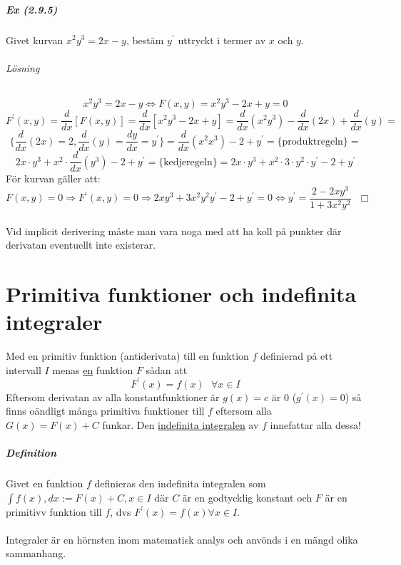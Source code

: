 \paragraph{Ex (2.9.5)} Givet kurvan $x^2y^3=2x-y$, bestäm $y^\prime$ uttryckt i termer av $x$ och $y$.
\subparagraph{Lösning}
\begin{equation*}
    x^2y^3=2x-y\Leftrightarrow F(x,y)=x^2y^3-2x+y=0
\end{equation*}
\begin{equation*}
    F^\prime(x,y)=\frac{d}{dx}[F(x,y)]=\frac{d}{dx}[x^2y^3-2x+y]=\frac{d}{dx}(x^2y^3)-\frac{d}{dx}(2x)+\frac{d}{dx}(y)=
\end{equation*}
\begin{equation*}
    \{\frac{d}{dx}(2x)=2,\frac{d}{dx}(y)=\frac{dy}{dx}=y^\prime\}=\frac{d}{dx}(x^2x^3)-2+y^\prime=\{\text{produktregeln}\}=
\end{equation*}
\begin{equation*}
    2x\cdot y^3+x^2\cdot\frac{d}{dx}(y^3)-2+y^\prime=\{\text{kedjeregeln}\}=2x\cdot y^3+x^2\cdot 3\cdot y^2\cdot y^\prime-2+y^\prime
\end{equation*}
För kurvan gäller att:
\begin{equation*}
    F(x,y)=0\Rightarrow F^\prime(x,y)=0\Rightarrow 2xy^3+3x^2y^2y^\prime-2+y^\prime=0\Leftrightarrow y^\prime=\frac{2-2xy^3}{1+3x^2y^2}\text{ }\Box
\end{equation*}
\\
Vid implicit derivering måste man vara noga med att ha koll på punkter där derivatan eventuellt inte existerar.

\chapter{Primitiva funktioner och indefinita integraler}
Med en primitiv funktion (antiderivata) till en funktion $f$ definierad på ett intervall $I$ menas \underline{en} funktion $F$ sådan att
\begin{equation*}
    F^\prime(x)=f(x)\text{ }\forall x\in I
\end{equation*}
Eftersom derivatan av alla konstantfunktioner är $g(x)=c$ är $0$ ($g^\prime(x)=0$) så finns oändligt många primitiva funktioner till $f$ eftersom alla $G(x)=F(x)+C$ funkar.
Den \underline{indefinita integralen} av $f$ innefattar alla dessa!

\paragraph{Definition} Givet en funktion $f$ definieras den indefinita integralen som $\int f(x),dx:=F(x)+C,x\in I$ där $C$ är en godtycklig konstant och $F$ är en primitivv funktion till $f$, dvs $F^\prime(x)=f(x)\forall x\in I$.
\\\\
Integraler är en hörnsten inom matematisk analys och anvönds i en mängd olika sammanhang.

